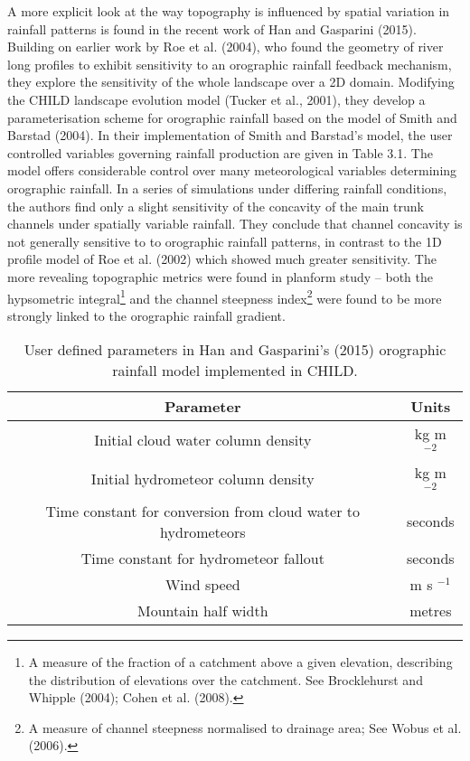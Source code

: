 \documentclass[12pt,oneside,PhD]{muthesis}
\begin{document}
A more explicit look at the way topography is influenced by spatial variation in rainfall patterns is found in the recent work of Han and Gasparini (2015). Building on earlier work by Roe et al. (2004), who found the geometry of river long profiles to exhibit sensitivity  to an orographic rainfall feedback mechanism, they explore the sensitivity of the whole landscape over a 2D domain. Modifying the CHILD landscape evolution model (Tucker et al., 2001), they develop a parameterisation scheme for orographic rainfall based on the model of  Smith and Barstad (2004). In their implementation of Smith and Barstad's model, the user controlled variables governing rainfall production are given in Table 3.1. The model offers considerable control over many meteorological variables determining orographic rainfall. In a series of simulations under differing rainfall conditions, the authors find only a slight sensitivity of the concavity of the main trunk channels under spatially variable rainfall. They conclude that channel concavity is not generally sensitive to to orographic rainfall patterns, in contrast to the 1D profile model of Roe et al. (2002) which showed much greater sensitivity. The more revealing topographic metrics were found in planform study -- both the hypsometric integral\footnote{A measure of the fraction of a catchment above a given elevation, describing the distribution of elevations over the catchment. See Brocklehurst and Whipple (2004); Cohen et al. (2008).} and the channel steepness index\footnote{A measure of channel steepness normalised to drainage area; See Wobus et al. (2006).} were found to be more strongly linked to the orographic rainfall gradient. 

\label{HanParameters}
\begin{table}
\begin{tabular}{|c|c|}
\hline 
\textbf{Parameter} & \textbf{Units}  \\ 
\hline 
Initial cloud water column density & kg m \(^{-2}\) \\ 
\hline 
Initial hydrometeor column density & kg m \(^{-2}\) \\ 
\hline 
Time constant for conversion from cloud water to hydrometeors & seconds \\ 
\hline 
Time constant for hydrometeor fallout & seconds \\ 
\hline 
Wind speed & m s \(^{-1}\) \\ 
\hline 
Mountain half width & metres \\ 
\hline 
\end{tabular} 
\caption{User defined parameters in Han and Gasparini's (2015) orographic rainfall model implemented in CHILD.}
\end{table}
\end{document}

